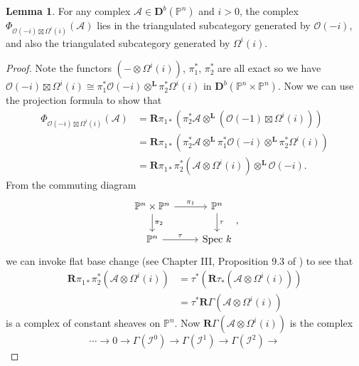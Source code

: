 \documentclass[a4paper]{article}
\theoremstyle{definition}
\newtheorem{lemma}[defn]{Lemma}
\theoremstyle{remark}
\newcommand{\deri}{\mathbf{D}}
\newcommand{\deritensor}{\ensuremath{\otimes^\mathbf{L}}}
\newcommand{\Pn}{\ensuremath{{\mathbb{P}^n}}}
\begin{document}
\begin{lemma}\label{generatorlemma2}
    For any complex \(\mathscr{A}\in \deri^b(\Pn)\) and \(i>0\), the complex
    \(\Phi_{\mathscr{O}(-i)\boxtimes \Omega^i(i)}(\mathscr{A})\) lies in the
    triangulated subcategory generated by  \(\mathscr{O}(-i)\), and also the
    triangulated subcategory generated by \(\Omega^i(i)\).
    \begin{proof} 
        Note the functors \((-\otimes\Omega^i(i))\), \(\pi_1^\ast\),
        \(\pi_2^\ast\) are all exact so we have
        \(\mathscr{O}(-i)\boxtimes\Omega^i(i)\cong \pi_1^\ast
        \mathscr{O}(-i)\deritensor \pi_2^\ast \Omega^i(i)\) in
        \(\deri^b(\Pn\times \Pn)\). Now we can use the projection formula to
        show that 
        \begin{align*} 
            \Phi_{\mathscr{O}(-i)\boxtimes \Omega^i(i)}(\mathscr{A}) 
            &= \mathbf{R}\pi_{1\ast} (\pi_2^\ast \mathscr{A}\deritensor
            (\mathscr{O}(-1)\boxtimes \Omega^i(i))) \\ 
            &= \mathbf{R}\pi_{1\ast} (\pi_2^\ast \mathscr{A}\deritensor
            \pi_1^\ast\mathscr{O}(-i)\deritensor \pi_2^\ast \Omega^i(i))  \\ 
            &= \mathbf{R}\pi_{1\ast}\pi_2^\ast (\mathscr{A}\otimes
            \Omega^i(i))\deritensor \mathscr{O}(-i).  
        \end{align*} 
        From the commuting diagram 
        \[\begin{tikzcd} 
            \Pn\times \Pn \arrow[r, "\pi_1"] \arrow[d,"\pi_2"] & \Pn
            \arrow[d,"\tau"] \\ 
            \Pn \arrow[r, "\tau"] & \text{Spec }k 
        \end{tikzcd},\] 
        we can invoke flat base change (see Chapter III, Proposition 9.3 of
        \cite{hartshorne_algebraic_2008}) to see that 
        \begin{align*} 
            \mathbf{R}\pi_{1\ast}\pi_2^\ast(\mathscr{A}\otimes \Omega^i(i)) 
            &= \tau^\ast (\mathbf{R}\tau_\ast (\mathscr{A}\otimes \Omega^i(i))) \\ 
            &= \tau^\ast \mathbf{R}\Gamma (\mathscr{A}\otimes \Omega^i(i)) 
        \end{align*} 
        is a complex of constant sheaves on \(\Pn\). Now
        \(\mathbf{R}\Gamma(\mathscr{A}\otimes \Omega^i(i))\) is the complex 
        \[\cdots \rightarrow 0\rightarrow \Gamma(\mathscr{I}^0)\rightarrow
            \Gamma(\mathscr{I}^1) \rightarrow \Gamma(\mathscr{I}^2) \rightarrow
\]
\end{proof}
\end{lemma}
\end{document}
